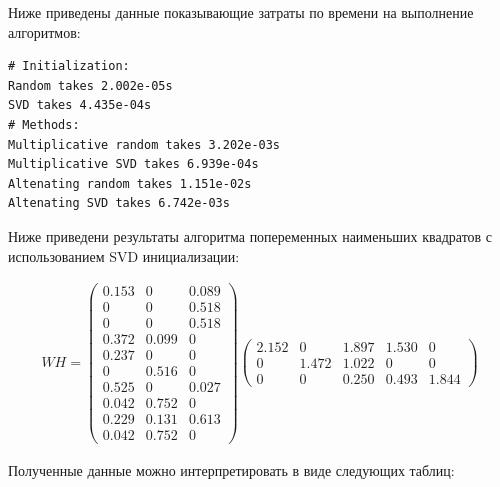 \newpage


Ниже приведены данные показывающие затраты по времени на выполнение алгоритмов:
\\

\begin{lstlisting}[caption=Затраты по времени на выполнение алгоритмов]
# Initialization:
Random takes 2.002e-05s
SVD takes 4.435e-04s
# Methods:
Multiplicative random takes 3.202e-03s
Multiplicative SVD takes 6.939e-04s
Altenating random takes 1.151e-02s
Altenating SVD takes 6.742e-03s
\end{lstlisting}

Ниже приведени результаты алгоритма попеременных наименьших квадратов с использованием SVD инициализации:

\begin{align*}
W H =
\begin{pmatrix}
     0.153  &   0  &   0.089 \\
     0  &   0  &   0.518 \\
     0  &   0  &   0.518 \\
     0.372  &   0.099  &   0 \\
     0.237  &   0  &   0 \\
     0  &   0.516  &   0 \\
     0.525  &  	0  &   0.027 \\
     0.042  &   0.752  &   0 \\
     0.229  &   0.131  &   0.613 \\
     0.042  &   0.752  &   0
\end{pmatrix}
\begin{pmatrix}
     2.152  &   0  &   1.897  &   1.530  &  0 \\
     0  &   1.472  &   1.022  &   0  &   0 \\
     0  &   0  &   0.250  &   0.493  &   1.844
\end{pmatrix}
\end{align*}



\newpage



Полученные данные можно интерпретировать в виде следующих таблиц:

